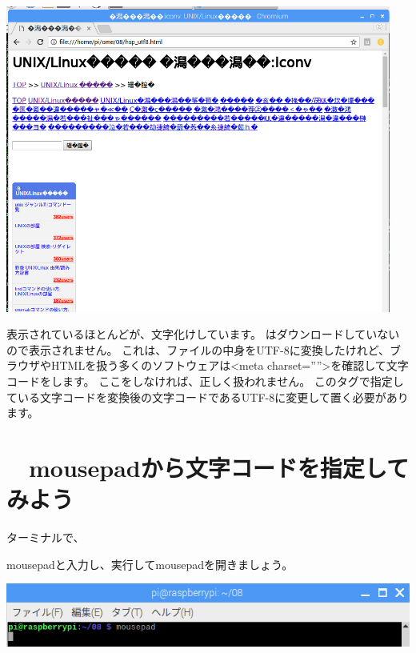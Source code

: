 \begin{center}
\includegraphics[width=0.95\textwidth]{./text08-img/textbook-img024.png}

\end{center}
表示されているほとんどが、文字化けしています。
はダウンロードしていないので表示されません。
これは、ファイルの中身をUTF-8に変換したけれど、ブラウザやHTMLを扱う多くのソフトウェアは{\textless}meta
charset=””{\textgreater}を確認して文字コードをします。
ここをしなければ、正しく扱われません。
このタグで指定している文字コードを変換後の文字コードであるUTF-8に変更して置く必要があります。



\clearpage\section{\theExercise　mousepadから文字コードを指定してみよう}
\addtocounter{Exercise}{-1}\label{E:iconv3}

ターミナルで、

mousepadと入力し、実行してmousepadを開きましょう。



\begin{center}
\includegraphics[width=\textwidth]{./text08-img/textbook-img006.png}

\end{center}

